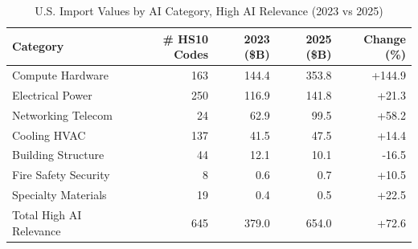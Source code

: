 \begin{table}[htbp]
\centering
\caption{U.S. Import Values by AI Category, High AI Relevance (2023 vs 2025)}
\label{tab:trade_by_category}
\setlength{\tabcolsep}{4.5mm}
\renewcommand{\arraystretch}{1.60}
\begin{tabular}{lrrrr}
\toprule
Category & \# HS10 Codes & 2023 (\$B) & 2025 (\$B) & Change (\%) \\
\midrule
Compute Hardware & 163 & 144.4 & 353.8 & +144.9 \\
Electrical Power & 250 & 116.9 & 141.8 & +21.3 \\
Networking Telecom & 24 & 62.9 & 99.5 & +58.2 \\
Cooling HVAC & 137 & 41.5 & 47.5 & +14.4 \\
Building Structure & 44 & 12.1 & 10.1 & -16.5 \\
Fire Safety Security & 8 & 0.6 & 0.7 & +10.5 \\
Specialty Materials & 19 & 0.4 & 0.5 & +22.5 \\
\midrule
Total High AI Relevance & 645 & 379.0 & 654.0 & +72.6 \\
\bottomrule
\end{tabular}
\end{table}
